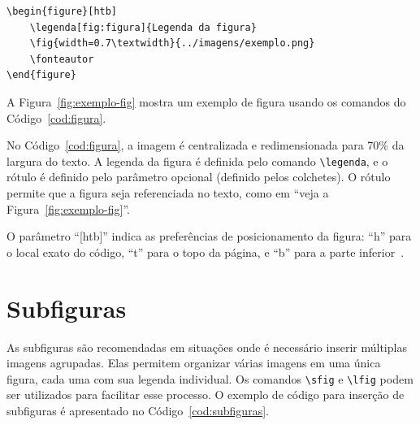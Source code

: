 \documentclass[
    12pt
    ,oneside
    ,a4paper
    ,chapter=TITLE
    ,section=TITLE
    ,sumario=abnt-6027-2012]{abntex2}
\begin{document}
\begin{codigo}[htb]
\begin{lstlisting}
\begin{figure}[htb]
    \legenda[fig:figura]{Legenda da figura}
    \fig{width=0.7\textwidth}{../imagens/exemplo.png}
    \fonteautor
\end{figure}
\end{lstlisting}
\fonteautor
\end{codigo}

A Figura~\ref{fig:exemplo-fig} mostra um exemplo de figura usando os comandos do  Código~\ref{cod:figura}. 

\begin{figure}[htb]
\end{figure}


No Código~\ref{cod:figura}, a imagem é centralizada e redimensionada para 70\% da largura do texto. A legenda da figura é definida pelo comando \texttt{\textbackslash legenda}, e o rótulo é definido pelo parâmetro opcional (definido pelos colchetes). O rótulo permite que a figura seja referenciada no texto, como em ``veja a Figura~\ref{fig:exemplo-fig}''. 

O parâmetro ``[htb]'' indica as preferências de posicionamento da figura: ``h'' para o local exato do código, ``t'' para o topo da página, e ``b'' para a parte inferior~\cite{goossens1997latex}. 

\section{Subfiguras}
\label{sec:subfiguras}

As subfiguras são recomendadas em situações onde é necessário inserir múltiplas imagens agrupadas. Elas permitem organizar várias imagens em uma única figura, cada uma com sua legenda individual. Os comandos \texttt{\textbackslash sfig} e \texttt{\textbackslash lfig} podem ser utilizados para facilitar esse processo. O exemplo de código para inserção de subfiguras é apresentado no Código~\ref{cod:subfiguras}.
\end{document}
